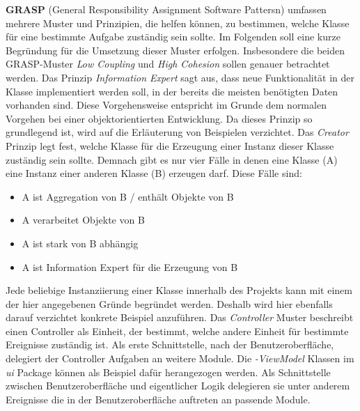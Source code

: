 \textbf{GRASP} (General Responsibility Assignment Software Pattersn) umfassen mehrere Muster und Prinzipien, die helfen können, zu bestimmen, welche Klasse für eine bestimmte Aufgabe zuständig sein sollte.
Im Folgenden soll eine kurze Begründung für die Umsetzung dieser Muster erfolgen.
Insbesondere die beiden GRASP-Muster \textit{Low Coupling} und \textit{High Cohesion} sollen genauer betrachtet werden.
\newline
\newline
Das Prinzip \textit{Information Expert} sagt aus, dass neue Funktionalität in der Klasse implementiert werden soll, in der bereits die meisten benötigten Daten vorhanden sind.
Diese Vorgehensweise entspricht im Grunde dem normalen Vorgehen bei einer objektorientierten Entwicklung.
Da dieses Prinzip so grundlegend ist, wird auf die Erläuterung von Beispielen verzichtet.
\newline
\newline
Das \textit{Creator} Prinzip legt fest, welche Klasse für die Erzeugung einer Instanz dieser Klasse zuständig sein sollte.
Demnach gibt es nur vier Fälle in denen eine Klasse (A) eine Instanz einer anderen Klasse (B) erzeugen darf.
Diese Fälle sind:
\begin{itemize}
    \item{A ist Aggregation von B / enthält Objekte von B}
    \item{A verarbeitet Objekte von B}
    \item{A ist stark von B abhängig}
    \item{A ist Information Expert für die Erzeugung von B}
\end{itemize}
Jede beliebige Instanziierung einer Klasse innerhalb des Projekts kann mit einem der hier angegebenen Gründe begründet werden.
Deshalb wird hier ebenfalls darauf verzichtet konkrete Beispiel anzuführen.
\newline
\newline
Das \textit{Controller} Muster beschreibt einen Controller als Einheit, der bestimmt, welche andere Einheit für bestimmte Ereignisse zuständig ist.
Als erste Schnittstelle, nach der Benutzeroberfläche, delegiert der Controller Aufgaben an weitere Module.
Die \textit{-ViewModel} Klassen im \textit{ui} Package können als Beispiel dafür herangezogen werden.
Als Schnittstelle zwischen Benutzeroberfläche und eigentlicher Logik delegieren sie unter anderem Ereignisse die in der Benutzeroberfläche auftreten an passende Module.

